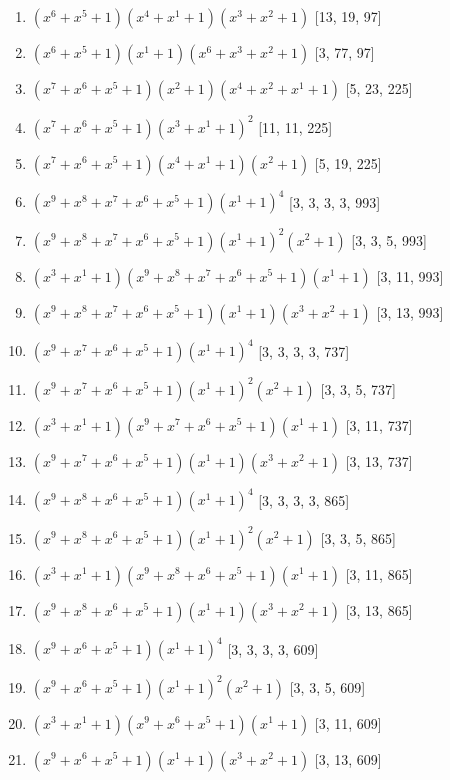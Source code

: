 \documentclass[10pt,twocolumn]{article}
\begin{document}
\begin{enumerate}
\item $(x^{6} + x^{5} + 1)(x^{4} + x^{1} + 1)(x^{3} + x^{2} + 1)$  [13, 19, 97]
\item $(x^{6} + x^{5} + 1)(x^{1} + 1)(x^{6} + x^{3} + x^{2} + 1)$  [3, 77, 97]
\item $(x^{7} + x^{6} + x^{5} + 1)(x^{2} + 1)(x^{4} + x^{2} + x^{1} + 1)$  [5, 23, 225]
\item $(x^{7} + x^{6} + x^{5} + 1)(x^{3} + x^{1} + 1)^{2}$  [11, 11, 225]
\item $(x^{7} + x^{6} + x^{5} + 1)(x^{4} + x^{1} + 1)(x^{2} + 1)$  [5, 19, 225]
\item $(x^{9} + x^{8} + x^{7} + x^{6} + x^{5} + 1)(x^{1} + 1)^{4}$  [3, 3, 3, 3, 993]
\item $(x^{9} + x^{8} + x^{7} + x^{6} + x^{5} + 1)(x^{1} + 1)^{2}(x^{2} + 1)$  [3, 3, 5, 993]
\item $(x^{3} + x^{1} + 1)(x^{9} + x^{8} + x^{7} + x^{6} + x^{5} + 1)(x^{1} + 1)$  [3, 11, 993]
\item $(x^{9} + x^{8} + x^{7} + x^{6} + x^{5} + 1)(x^{1} + 1)(x^{3} + x^{2} + 1)$  [3, 13, 993]
\item $(x^{9} + x^{7} + x^{6} + x^{5} + 1)(x^{1} + 1)^{4}$  [3, 3, 3, 3, 737]
\item $(x^{9} + x^{7} + x^{6} + x^{5} + 1)(x^{1} + 1)^{2}(x^{2} + 1)$  [3, 3, 5, 737]
\item $(x^{3} + x^{1} + 1)(x^{9} + x^{7} + x^{6} + x^{5} + 1)(x^{1} + 1)$  [3, 11, 737]
\item $(x^{9} + x^{7} + x^{6} + x^{5} + 1)(x^{1} + 1)(x^{3} + x^{2} + 1)$  [3, 13, 737]
\item $(x^{9} + x^{8} + x^{6} + x^{5} + 1)(x^{1} + 1)^{4}$  [3, 3, 3, 3, 865]
\item $(x^{9} + x^{8} + x^{6} + x^{5} + 1)(x^{1} + 1)^{2}(x^{2} + 1)$  [3, 3, 5, 865]
\item $(x^{3} + x^{1} + 1)(x^{9} + x^{8} + x^{6} + x^{5} + 1)(x^{1} + 1)$  [3, 11, 865]
\item $(x^{9} + x^{8} + x^{6} + x^{5} + 1)(x^{1} + 1)(x^{3} + x^{2} + 1)$  [3, 13, 865]
\item $(x^{9} + x^{6} + x^{5} + 1)(x^{1} + 1)^{4}$  [3, 3, 3, 3, 609]
\item $(x^{9} + x^{6} + x^{5} + 1)(x^{1} + 1)^{2}(x^{2} + 1)$  [3, 3, 5, 609]
\item $(x^{3} + x^{1} + 1)(x^{9} + x^{6} + x^{5} + 1)(x^{1} + 1)$  [3, 11, 609]
\item $(x^{9} + x^{6} + x^{5} + 1)(x^{1} + 1)(x^{3} + x^{2} + 1)$  [3, 13, 609]

\end{enumerate}
\end{document}
